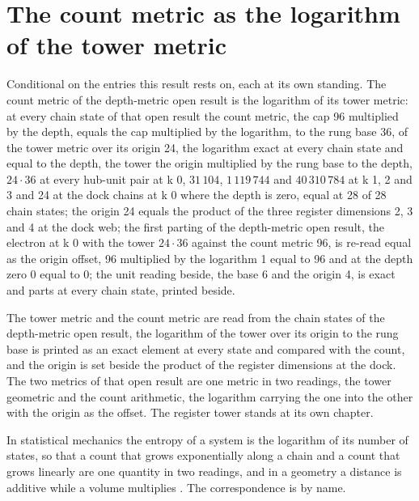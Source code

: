 \section{The count metric as the logarithm of the tower metric}\label{mod:X-5-D542610-lgtw-t1}
\begin{chconditional}\label{box:X-5-D542610-lgtw-t1:1}
Conditional on the entries this result rests on, each at its own standing. The count metric of the depth-metric open result is the logarithm of its tower metric: at every chain state of that open result the count metric, the cap 96 multiplied by the depth, equals the cap multiplied by the logarithm, to the rung base 36, of the tower metric over its origin 24, the logarithm exact at every chain state and equal to the depth, the tower the origin multiplied by the rung base to the depth, $24\cdot 36$ at every hub-unit pair at k 0, $31\,104$, $1\,119\,744$ and $40\,310\,784$ at k 1, 2 and 3 and 24 at the dock chains at k 0 where the depth is zero, equal at 28 of 28 chain states; the origin 24 equals the product of the three register dimensions 2, 3 and 4 at the dock web; the first parting of the depth-metric open result, the electron at k 0 with the tower $24\cdot 36$ against the count metric 96, is re-read equal as the origin offset, 96 multiplied by the logarithm 1 equal to 96 and at the depth zero 0 equal to 0; the unit reading beside, the base 6 and the origin 4, is exact and parts at every chain state, printed beside.
\end{chconditional}
The tower metric and the count metric are read from the chain states of the depth-metric open result, the logarithm of the tower over its origin to the rung base is printed as an exact element at every state and compared with the count, and the origin is set beside the product of the register dimensions at the dock. The two metrics of that open result are one metric in two readings, the tower geometric and the count arithmetic, the logarithm carrying the one into the other with the origin as the offset. The register tower stands at its own chapter.
\begin{chbridge}
In statistical mechanics the entropy of a system is the logarithm of its number of states, so that a count that grows exponentially along a chain and a count that grows linearly are one quantity in two readings, and in a geometry a distance is additive while a volume multiplies \cite{Gibbs1902,Wald1984}. The correspondence is by name.
\end{chbridge}
